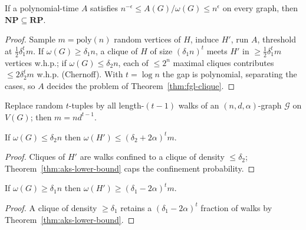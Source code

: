 \begin{lemma}
  \label{lem:clique-inapprox}
  If a polynomial-time $A$ satisfies $n^{-\epsilon}\le A(G)/\omega(G)\le
  n^{\epsilon}$ on every graph, then $\mathbf{NP}\subseteq\mathbf{RP}$.
\end{lemma}
\begin{proof}
  Sample $m=\mathrm{poly}(n)$ random vertices of $H$, induce $H'$, run $A$,
  threshold at $\tfrac12\delta_1^tm$. If $\omega(G)\ge\delta_1n$, a clique of $H$
  of size $(\delta_1n)^t$ meets $H'$ in $\ge\tfrac12\delta_1^tm$ vertices w.h.p.;
  if $\omega(G)\le\delta_2n$, each of $\le2^n$ maximal cliques contributes
  $\le2\delta_2^tm$ w.h.p. (Chernoff). With $t=\log n$ the gap is polynomial,
  separating the cases, so $A$ decides the problem of
  Theorem~\ref{thm:fgl-clique}.
\end{proof}

\begin{construction}
  \label{constr:derandomized-H}
  Replace random $t$-tuples by all length-$(t-1)$ walks of an
  $(n,d,\alpha)$-graph $\mathcal G$ on $V(G)$; then $m=nd^{t-1}$.
\end{construction}

\begin{claim}
  \label{claim:derand-upper}
  If $\omega(G)\le\delta_2n$ then $\omega(H')\le(\delta_2+2\alpha)^tm$.
\end{claim}
\begin{proof}
  Cliques of $H'$ are walks confined to a clique of density $\le\delta_2$;
  Theorem~\ref{thm:aks-lower-bound} caps the confinement probability.
\end{proof}

\begin{claim}
  \label{claim:derand-lower}
  If $\omega(G)\ge\delta_1n$ then $\omega(H')\ge(\delta_1-2\alpha)^tm$.
\end{claim}
\begin{proof}
  A clique of density $\ge\delta_1$ retains a $(\delta_1-2\alpha)^t$ fraction of
  walks by Theorem~\ref{thm:aks-lower-bound}.
\end{proof}


